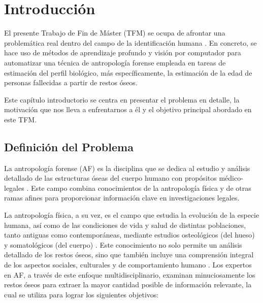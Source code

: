 \chapter{Introducción}
El presente Trabajo de Fin de Máster (TFM) se ocupa de afrontar una problemática real dentro del campo de la identificación humana \cite{thompson_forensic_2006}. En concreto, se hace uso de métodos de aprendizaje profundo y visión por computador para automatizar una técnica de antropología forense empleada en tareas de estimación del perfil biológico, más específicamente, la estimación de la edad de personas fallecidas a partir de restos óseos. 

Este capítulo introductorio se centra en presentar el problema en detalle, la motivación que nos lleva a enfrentarnos a él y el objetivo principal abordado en este TFM. 


\section{Definición del Problema}
\label{daIntro_ProblemDef}
La antropología forense (AF) es la disciplina que se dedica al estudio y análisis detallado de las estructuras óseas del cuerpo humano con propósitos médico-legales \cite{byers_introduction_2016,RefWorks:RefID:17-christensen2019forensic}. Este campo combina conocimientos de la antropología física y de otras ramas afines para proporcionar información clave en investigaciones legales.

La antropología física, a su vez, es el campo que estudia la evolución de la especie humana, así como de las condiciones de vida y salud de distintas poblaciones, tanto antiguas como contemporáneas, mediante estudios osteológicos (del hueso) y somatológicos (del cuerpo) \cite{jurmain_introduction_2018}. Este conocimiento no solo permite un análisis detallado de los restos óseos, sino que también incluye una comprensión integral de los aspectos sociales, culturales y de comportamiento humano \cite{antrofisica}. Los expertos en AF, a través de este enfoque multidisciplinario, examinan minuciosamente los restos óseos para extraer la mayor cantidad posible de información relevante, la cual se utiliza para lograr los siguientes objetivos:


